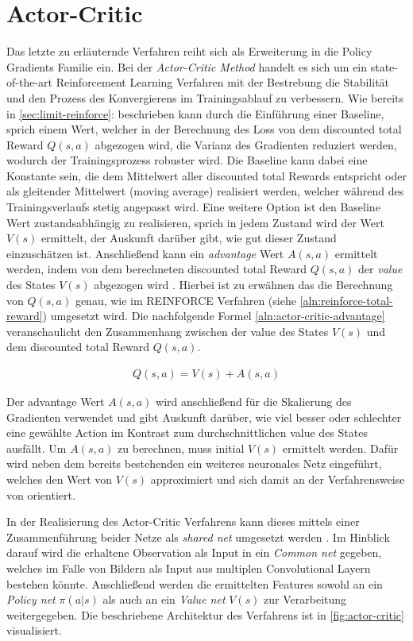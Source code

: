 \documentclass[11pt]{scrartcl}
\begin{document}
\section{Actor-Critic}
Das letzte zu erläuternde Verfahren reiht sich als Erweiterung in die Policy Gradients Familie ein.
Bei der \textit{Actor-Critic Method} handelt es sich um ein state-of-the-art Reinforcement Learning
Verfahren mit der Bestrebung die Stabilität und den Prozess des Konvergierens im Trainingsablauf
zu verbessern. Wie bereits in \autoref{sec:limit-reinforce}:  beschrieben
kann durch die Einführung einer Baseline, sprich einem Wert, welcher in der Berechnung des Loss von dem
discounted total Reward $Q(s,a)$ abgezogen wird, die Varianz des Gradienten reduziert werden, wodurch
der Trainingsprozess robuster wird. Die Baseline kann dabei eine Konstante sein, die dem Mittelwert 
aller discounted total Rewards entspricht oder als gleitender Mittelwert (moving average) realisiert
werden, welcher während des Trainingsverlaufs stetig angepasst wird. Eine weitere Option ist den Baseline
Wert zustandsabhängig zu realisieren, sprich in jedem Zustand wird der Wert $V(s)$ ermittelt, der Auskunft
darüber gibt, wie gut dieser Zustand einzuschätzen ist. Anschließend kann ein \textit{advantage} Wert
$A(s,a)$ ermittelt werden, indem von dem berechneten discounted total Reward $Q(s,a)$ der \textit{value}
des States $V(s)$ abgezogen wird \cite[~S.268 ff.]{L2018}. Hierbei ist zu erwähnen das die Berechnung von
$Q(s,a)$ genau, wie im REINFORCE Verfahren (siehe \autoref{aln:reinforce-total-reward}) umgesetzt wird.
Die nachfolgende Formel \ref{aln:actor-critic-advantage} veranschaulicht den Zusammenhang zwischen der
value des States $V(s)$ und dem discounted total Reward $Q(s,a)$.

\begin{align}
Q(s,a)=V(s)+A(s,a)
\label{aln:actor-critic-advantage}
\end{align}

Der advantage Wert $A(s,a)$ wird anschließend für die Skalierung des Gradienten verwendet und gibt Auskunft
darüber, wie viel besser oder schlechter eine gewählte Action im Kontrast zum durchschnittlichen value des
States ausfällt. Um $A(s,a)$ zu berechnen, muss initial $V(s)$ ermittelt werden. Dafür wird neben dem bereits
bestehenden ein weiteres neuronales Netz eingeführt, welches den Wert von $V(s)$ approximiert und sich damit
an der Verfahrensweise von  orientiert.

In der Realisierung des Actor-Critic Verfahrens kann dieses mittels einer Zusammenführung beider Netze als
\textit{shared net} umgesetzt werden  \cite[~S.269]{L2018}. Im Hinblick darauf wird die erhaltene
Observation als Input in ein \textit{Common net} gegeben, welches im Falle von Bildern als Input aus
multiplen Convolutional Layern bestehen könnte. Anschließend werden die ermittelten Features sowohl an
ein \textit{Policy net} $\pi(a|s)$ als auch an ein \textit{Value net} $V(s)$ zur Verarbeitung
weitergegeben. Die beschriebene Architektur des Verfahrens ist in \autoref{fig:actor-critic}
visualisiert.
\end{document}
